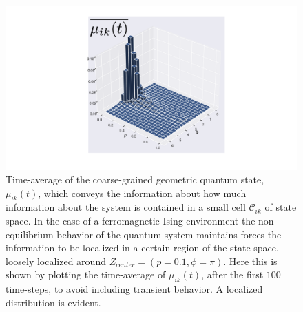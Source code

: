 \documentclass[draft,nofootinbib,pre,twocolumn,showpacs,showkeys,preprintnumbers,floatfix]{revtex4-1}
\newcommand{\CC}[2]{\mathcal{C}_{#1 #2}}
\newcommand{\1}{\mathbbm{1}}
\begin{document}
\begin{figure}[t!]
\centering
\includegraphics[width=.3\textwidth]{./img/mu_average.pdf}
\caption{Time-average of the coarse-grained geometric quantum 
state, $\mu_{ik}(t)$, which conveys the information about how much
information about the system is contained in a small cell $\CC{i}{k}$ of state space.
In the case of a ferromagnetic Ising environment the non-equilibrium behavior
of the quantum system maintains forces the information to be localized in a certain
region of the state space, loosely localized around $Z_{center}=(p=0.1,\phi = \pi)$.
Here this is shown by plotting the time-average of $\mu_{ik}(t)$, after the first
$100$ time-steps, to avoid including transient behavior. A localized distribution
is evident.
	}
\label{fig:mu_average}
\end{figure}
\end{document}
